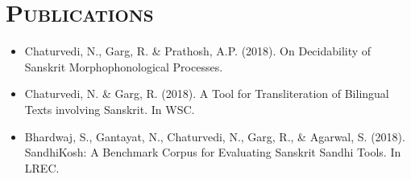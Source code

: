 \documentclass{article}
\newcommand{\tmpsection}[1]{}
\let\tmpsection=\section
\renewcommand{\section}[1]{\tmpsection*{\textsc{#1}}}
\begin{document}
\section{Publications}
\begin{itemize}
\setlength\itemsep{0em}
\item Chaturvedi, N., Garg, R. \& Prathosh, A.P. (2018). On Decidability of Sanskrit Morphophonological Processes.
\item Chaturvedi, N. \& Garg, R. (2018). A Tool for Transliteration of Bilingual Texts involving Sanskrit. In WSC.
\item Bhardwaj, S., Gantayat, N., Chaturvedi, N., Garg, R., \& Agarwal, S. (2018). SandhiKosh: A Benchmark Corpus for Evaluating Sanskrit Sandhi Tools. In LREC.
\end{itemize}
\end{document}
